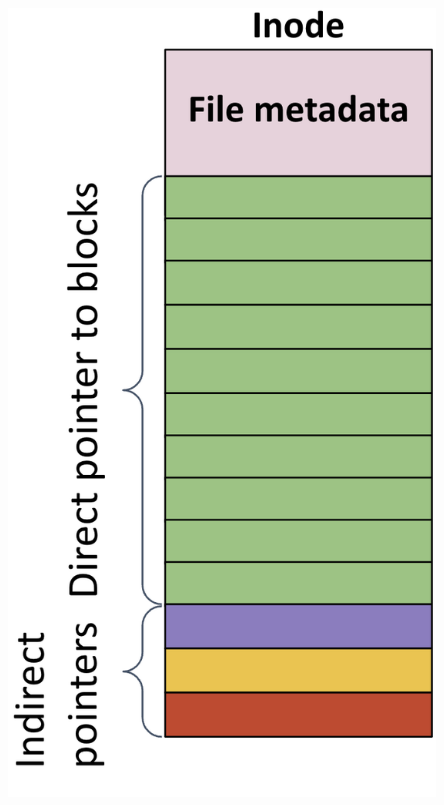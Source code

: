 \documentclass[../../compsys.tex]{subfiles}
\begin{document}
\begin{minipage}{0.35\textwidth}
  \begin{center}
    \includegraphics[width=0.85\textwidth]{chapters/L7/images/inode.png}
  \end{center}
\end{minipage}
 
\end{document}
